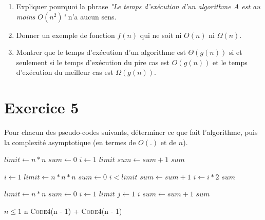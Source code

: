 \documentclass[a4paper,10pt]{article}
\begin{document}
\begin{enumerate}

\item Expliquer pourquoi la phrase \textit{"Le temps d'exécution d'un algorithme $A$ est au moins $O(n^2)$"} n'a aucun sens.

\item Donner un exemple de fonction $f(n)$ qui ne soit ni $O(n)$ ni $\Omega(n)$.

\item Montrer que le temps d'exécution d'un algorithme est $\Theta(g(n))$ si et seulement si le temps d'exécution du pire cas est $O(g(n))$ et le temps d'exécution du meilleur cas est $\Omega(g(n))$.

\end{enumerate}

\section*{Exercice 5}

Pour chacun des pseudo-codes suivants, déterminer ce que fait l'algorithme, puis
la complexité asymptotique (en termes de $O(.)$ et de $n$).

\vspace{10pt}
\begin{codebox}
    \li $limit\gets n*n$
    \li $sum\gets 0$
    \li \For $i\gets 1$ \To $limit$
    \li \Do $sum\gets sum+1$
        \End
    \li \Return $sum$
    \End
\end{codebox}
\vspace{10pt}

\begin{codebox}
    \li $i\gets 1$
    \li $limit\gets n*n*n$
    \li $sum\gets 0$
    \li \While $i < limit$
    \li \Do $sum\gets sum+1$
    \li     $i\gets i*2$
        \End
    \li \Return $sum$
    \End
\end{codebox}
\vspace{10pt}

\begin{codebox}
    \li $limit\gets n*n$
    \li $sum\gets 0$
    \li \For $i\gets 1$ \To $limit$
    \li \Do \For $j\gets 1$ \To $i$
    \li     \Do $sum\gets sum+1$
            \End
        \End
    \li \Return $sum$
    \End
\end{codebox}
\vspace{10pt}

\begin{codebox}
    \li \If $n \leq 1$
        \Then
    \li     \Return n
    \li \Else
    \li     \Return \textsc{Code4}(n - 1) + \textsc{Code4}(n - 1)
       \End
\end{codebox}
\vspace{10pt}
\end{document}
